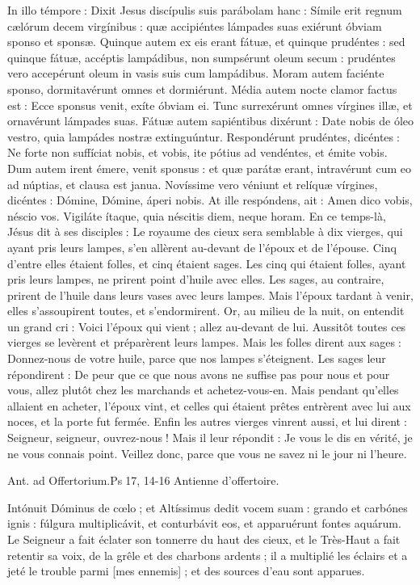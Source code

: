 \begin{paracol}{2}
In illo témpore : Dixit Jesus discípulis  suis parábolam hanc : Símile erit regnum cælórum decem virgínibus : quæ accipiéntes lámpades suas exiérunt óbviam sponso et sponsæ. Quinque autem ex eis erant fátuæ, et quinque prudéntes : sed quinque fátuæ, accéptis lampádibus, non sumpsérunt oleum secum : prudéntes vero accepérunt oleum in vasis suis cum lampádibus. Moram autem faciénte sponso, dormitavérunt omnes et dormiérunt. Média autem nocte clamor factus est : Ecce sponsus venit, exíte óbviam ei. Tunc surrexérunt omnes vírgines illæ, et ornavérunt lámpades suas. Fátuæ autem sapiéntibus dixérunt : Date nobis de óleo vestro, quia lampádes nostræ extinguúntur. Respondérunt prudéntes, dicéntes : Ne forte non suffíciat nobis, et vobis, ite pótius ad vendéntes, et émite vobis. Dum autem irent émere, venit sponsus : et quæ parátæ erant, intravérunt cum eo ad núptias, et clausa est janua. Novíssime vero véniunt et relíquæ vírgines, dicéntes : Dómine, Dómine, áperi nobis. At ille respóndens, ait : Amen dico vobis, néscio vos. Vigiláte ítaque, quia néscitis diem, neque horam.
\switchcolumn
En ce temps-là, Jésus dit à ses disciples :  Le royaume des cieux sera semblable à dix vierges, qui ayant pris leurs lampes, s’en allèrent au-devant de l’époux et de l’épouse. Cinq d’entre elles étaient folles, et cinq étaient sages. Les cinq qui étaient folles, ayant pris leurs lampes, ne prirent point d’huile avec elles. Les sages, au contraire, prirent de l’huile dans leurs vases avec leurs lampes. Mais l’époux tardant à venir, elles s’assoupirent toutes, et s’endormirent. Or, au milieu de la nuit, on entendit un grand cri : Voici l’époux qui vient ; allez au-devant de lui. Aussitôt toutes ces vierges se levèrent et préparèrent leurs lampes. Mais les folles dirent aux sages : Donnez-nous de votre huile, parce que nos lampes s’éteignent. Les sages leur répondirent : De peur que ce que nous avons ne suffise pas pour nous et pour vous, allez plutôt chez les marchands et achetez-vous-en. Mais pendant qu’elles allaient en acheter, l’époux vint, et celles qui étaient prêtes entrèrent avec lui aux noces, et la porte fut fermée. Enfin les autres vierges vinrent aussi, et lui dirent : Seigneur, seigneur, ouvrez-nous ! Mais il leur répondit : Je vous le dis en vérité, je ne vous connais point. Veillez donc, parce que vous ne savez ni le jour ni l’heure.
\switchcolumn*

Ant. ad Offertorium.\hfill Ps 17, 14-16
\switchcolumn
Antienne d’offertoire.
\switchcolumn*

Intónuit Dóminus de cœlo ; et Altíssimus dedit vocem suam : grando et carbónes ignis : fúlgura multiplicávit, et conturbávit eos, et apparuérunt fontes aquárum.
\switchcolumn
Le Seigneur a fait éclater son tonnerre du haut des cieux, et le Très-Haut a fait retentir sa voix, de la grêle et des charbons ardents ; il a multiplié les éclairs et a jeté le trouble parmi [mes ennemis] ; et des sources d’eau sont apparues.
\switchcolumn*


\end{paracol}
